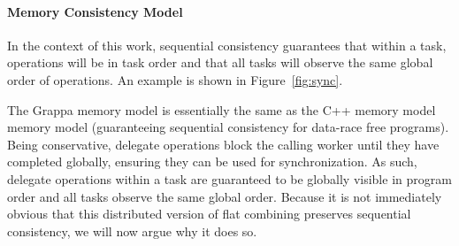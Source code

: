 


\paragraph{Memory Consistency Model}

In the context of this work, sequential consistency guarantees that within a
task, operations will be in task order and that all tasks will observe the
same global order of operations. An example is shown in
Figure~\ref{fig:sync}.

The Grappa memory model is essentially the same as the C++ memory
model~\cite{boehm:drf0,N2480,N2800} memory model (guaranteeing sequential
consistency for data-race free programs). Being conservative, delegate
operations block the calling worker until they have completed globally,
ensuring they can be used for synchronization. As such, delegate operations
within a task are guaranteed to be globally visible in program order and all
tasks observe the same global order. Because it is not immediately obvious
that this distributed version of flat combining preserves sequential
consistency, we will now argue why it does so.

